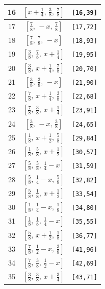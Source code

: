 \documentclass[fleqn,8pt]{jsarticle}
\begin{document}
\begin{longtable}{ccc}
16 & $\left[ x + \frac{1}{4},\, \frac{3}{8},\, \frac{7}{8} \right]$ & {\tt [16,39]} \\ \hline
17 & $\left[ \frac{7}{8},\, - x,\, \frac{7}{8} \right]$ & {\tt [17,72]} \\ \hline
18 & $\left[ \frac{7}{8},\, \frac{7}{8},\, - x \right]$ & {\tt [18,93]} \\ \hline
19 & $\left[ \frac{3}{8},\, \frac{7}{8},\, x + \frac{1}{4} \right]$ & {\tt [19,95]} \\ \hline
20 & $\left[ \frac{3}{8},\, x + \frac{1}{4},\, \frac{7}{8} \right]$ & {\tt [20,70]} \\ \hline
21 & $\left[ \frac{3}{8},\, \frac{3}{8},\, - x \right]$ & {\tt [21,90]} \\ \hline
22 & $\left[ \frac{7}{8},\, x + \frac{1}{4},\, \frac{3}{8} \right]$ & {\tt [22,68]} \\ \hline
23 & $\left[ \frac{7}{8},\, \frac{3}{8},\, x + \frac{1}{4} \right]$ & {\tt [23,91]} \\ \hline
24 & $\left[ \frac{3}{8},\, - x,\, \frac{3}{8} \right]$ & {\tt [24,65]} \\ \hline
25 & $\left[ \frac{1}{8},\, x + \frac{1}{2},\, \frac{5}{8} \right]$ & {\tt [29,84]} \\ \hline
26 & $\left[ \frac{1}{8},\, \frac{5}{8},\, x + \frac{1}{2} \right]$ & {\tt [30,57]} \\ \hline
27 & $\left[ \frac{5}{8},\, \frac{5}{8},\, \frac{1}{4} - x \right]$ & {\tt [31,59]} \\ \hline
28 & $\left[ \frac{5}{8},\, \frac{1}{4} - x,\, \frac{5}{8} \right]$ & {\tt [32,82]} \\ \hline
29 & $\left[ \frac{5}{8},\, \frac{1}{8},\, x + \frac{1}{2} \right]$ & {\tt [33,54]} \\ \hline
30 & $\left[ \frac{1}{8},\, \frac{1}{4} - x,\, \frac{1}{8} \right]$ & {\tt [34,80]} \\ \hline
31 & $\left[ \frac{1}{8},\, \frac{1}{8},\, \frac{1}{4} - x \right]$ & {\tt [35,55]} \\ \hline
32 & $\left[ \frac{5}{8},\, x + \frac{1}{2},\, \frac{1}{8} \right]$ & {\tt [36,77]} \\ \hline
33 & $\left[ \frac{7}{8},\, \frac{1}{2} - x,\, \frac{3}{8} \right]$ & {\tt [41,96]} \\ \hline
34 & $\left[ \frac{7}{8},\, \frac{3}{8},\, \frac{1}{2} - x \right]$ & {\tt [42,69]} \\ \hline
35 & $\left[ \frac{3}{8},\, \frac{3}{8},\, x + \frac{3}{4} \right]$ & {\tt [43,71]} \\ \hline

\end{longtable}
\end{document}
